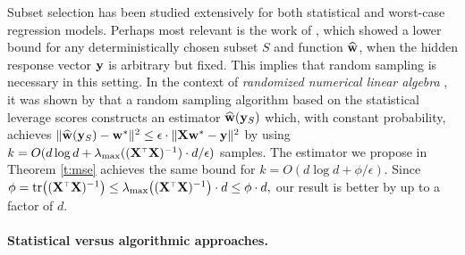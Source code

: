 \documentclass[12pt]{sty/colt2019/colt2018-arxiv}
\begin{document}
Subset selection has been studied extensively for both statistical and worst-case regression models.
Perhaps most relevant is the work of \cite{coresets-regression}, which
showed a lower bound for any deterministically chosen subset $S$ and
function $\widehat{\mathbf w}$, when the hidden response vector $\mathbf y$ is arbitrary but
fixed.
This implies that random sampling is necessary in this setting.
In the context of \emph{randomized numerical linear algebra}
\citep[RandNLA; see][]{woodruff2014sketching, DM16_CACM}, it was shown by
\cite{drineas2006sampling} that a random sampling algorithm based on the statistical leverage scores
constructs an estimator $\widehat{\mathbf w}(\mathbf y_S)$ which, with constant probability, achieves $\|\widehat{\mathbf w}(\mathbf y_S)-\mathbf w^*\|^2\leq\epsilon\cdot \|\mathbf X\mathbf w^*-\mathbf y\|^2$ by using $k=O(d\log d + \lambda_{\max}((\X^\top\X)^{-1})\cdot d/\epsilon)$ samples.
The estimator we propose in Theorem \ref{t:mse} achieves the same
bound for $k=O(d\log d + \phi/\epsilon)$. 
Since 
$ %
\phi=\tr\big((\X^\top\X)^{-1}\big) \leq
  \lambda_{\max}\big((\X^\top\X)^{-1}\big)\cdot d \leq   \phi\cdot d  ,
$ %
our result is better by up to a factor of $d$.



\paragraph{Statistical versus algorithmic approaches.}
\end{document}

